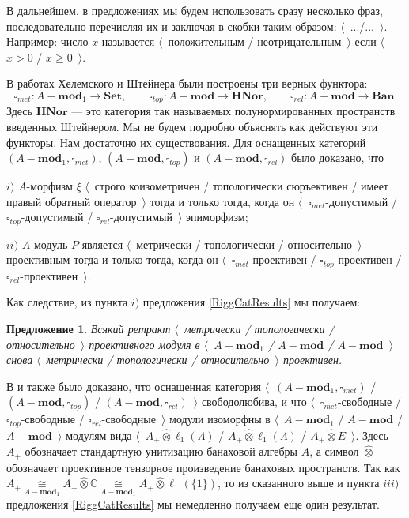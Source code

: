 \documentclass[12pt]{article}
\numberwithin{equation}{subsection}
\theoremstyle{plain}
\newtheorem{proposition}{Предложение}
\newcommand{\projtens}{\mathbin{\widehat{\otimes}}}
\newcommand{\isom}[1]{\mathop{\mathbin{\cong}}\limits_{#1}}
\begin{document}
\begin{fulltext}
В дальнейшем, в предложениях мы будем использовать сразу несколько фраз, последовательно перечисляя их и заключая в скобки таким образом: $\langle$~.../...~$\rangle$. Например: число $x$ называется $\langle$~положительным / неотрицательным~$\rangle$ если $\langle$~$x>0$ / $x\geq 0$~$\rangle$.

В работах Хелемского \cite{HelMetrFrQMod} и Штейнера \cite{ShtTopFrClassicQuantMod} были построены три верных функтора:
$$
\square_{met}:A-\mathbf{mod}_1\to\mathbf{Set},\qquad
\square_{top}:A-\mathbf{mod}\to\mathbf{HNor},\qquad
\square_{rel}:A-\mathbf{mod}\to\mathbf{Ban}.
$$
Здесь $\mathbf{HNor}$ --- это категория так называемых полунормированных пространств введенных Штейнером. Мы не будем подробно объяснять как действуют эти функторы. Нам достаточно их существования. Для оснащенных категорий $(A-\mathbf{mod}_1,\square_{met})$, $(A-\mathbf{mod},\square_{top})$ и $(A-\mathbf{mod},\square_{rel})$ было доказано, что 

$i)$ $A$-морфизм $\xi$ $\langle$~строго коизометричен / топологически сюръективен / имеет правый обратный оператор~$\rangle$ тогда и только тогда, когда он $\langle$~$\square_{met}$-допустимый / $\square_{top}$-допустимый / $\square_{rel}$-допустимый~$\rangle$ эпиморфизм;

$ii)$ $A$-модуль $P$ является $\langle$~метрически / топологически / относительно~$\rangle$ проективным тогда и только тогда, когда он $\langle$~$\square_{met}$-проективен / $\square_{top}$-проективен / $\square_{rel}$-проективен~$\rangle$.

Как следствие, из пункта $i)$ предложения \ref{RiggCatResults} мы получаем:

\begin{proposition}\label{RetrMetTopProjIsMetTopProj} Всякий ретракт $\langle$~метрически / топологически / относительно~$\rangle$ проективного модуля в $\langle$~$A-\mathbf{mod}_1$ / $A-\mathbf{mod}$ / $A-\mathbf{mod}$~$\rangle$ снова $\langle$~метрически / топологически / относительно~$\rangle$ проективен.
\end{proposition}

В \cite{HelMetrFrQMod} и \cite{ShtTopFrClassicQuantMod} также было доказано, что оснащенная категория $\langle$~$(A-\mathbf{mod}_1,\square_{met})$ / $(A-\mathbf{mod},\square_{top})$ / $(A-\mathbf{mod},\square_{rel})$~$\rangle$ свободолюбива, и что $\langle$~$\square_{met}$-свободные / $\square_{top}$-свободные / $\square_{rel}$-свободные~$\rangle$ модули изоморфны в $\langle$~$A-\mathbf{mod}_1$ / $A-\mathbf{mod}$ / $A-\mathbf{mod}$~$\rangle$ модулям вида $\langle$~$A_+\projtens \ell_1(\Lambda)$ / $A_+\projtens \ell_1(\Lambda)$ / $A_+\projtens E$~$\rangle$. Здесь $A_+$ обозначает стандартную унитизацию банаховой алгебры $A$, а символ $\projtens$ обозначает проективное тензорное произведение банаховых пространств. Так как $A_+\isom{A-\mathbf{mod}_1}A_+\projtens\mathbb{C}\isom{A-\mathbf{mod}_1}A_+\projtens\ell_1(\{1\})$, то из сказанного выше и пункта $iii)$ предложения \ref{RiggCatResults} мы немедленно получаем еще один результат.


\end{fulltext}
\end{document}
